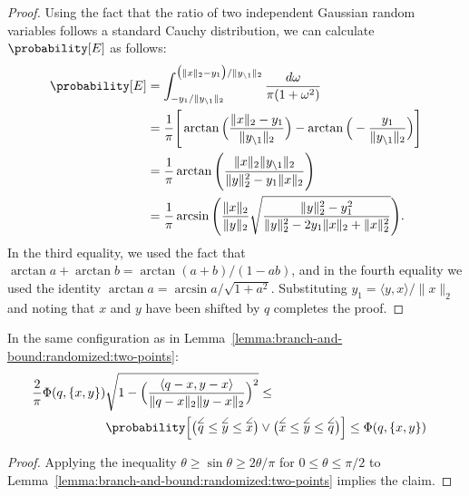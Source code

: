 \begin{proof}
Using the fact that the ratio of two independent Gaussian random variables follows a standard Cauchy distribution,
we can calculate $\probability[ E ]$ as follows:
\begin{align*}
    \probability[ E ] &= \int_{-y_1/\lVert y_{\setminus 1} \rVert_2}^{\big(\lVert x \rVert_2 - y_1\big)/\lVert y_{\setminus 1} \rVert_2} \frac{d \omega}{\pi (1 + \omega^2)} \\
    &= \frac{1}{\pi} \Bigg[ \arctan\Big( \frac{\lVert x \rVert_2 - y_1}{\lVert y_{\setminus 1} \rVert_2} \Big) - \arctan \Big( -\frac{y_1}{\lVert y_{\setminus 1} \rVert_2} \Big) \Bigg] \\
    &= \frac{1}{\pi} \arctan\Bigg( \frac{\lVert x \rVert_2 \lVert y_{\setminus 1} \rVert_2}{\lVert y \rVert_2^2 - y_1 \lVert x \rVert_2} \Bigg) \\
    &= \frac{1}{\pi} \arcsin\Bigg( \frac{\lVert x \rVert_2}{\lVert y \rVert_2} \sqrt{\frac{\lVert y \rVert_2^2 - y_1^2}{\lVert y \rVert_2^2 - 2y_1 \lVert x \rVert_2 + \lVert x \rVert_2^2}} \Bigg).
\end{align*}
In the third equality, we used the fact that $\arctan a + \arctan b = \arctan (a + b)/(1 - ab)$, and in the fourth equality
we used the identity $\arctan a = \arcsin a / \sqrt{1 + a^2}$. Substituting $y_1 = \langle y, x \rangle / \lVert x \rVert_2$
and noting that $x$ and $y$ have been shifted by $q$ completes the proof.
\end{proof}

\begin{corollary}
\label{lemma:branch-and-bound:randomized:two-points-corollary}
    In the same configuration as in Lemma~\ref{lemma:branch-and-bound:randomized:two-points}:
    \begin{align*}
        \frac{2}{\pi} \Phi(q, \{ x, y\})
            & \sqrt{1 - \Big(
                \frac{\langle q - x, y - x \rangle}{\lVert q - x \rVert_2 \lVert y - x \rVert_2}
            \Big)^2} \leq& \\
        &\probability\Big[
            \big( \overset{\angle}{q} \leq \overset{\angle}{y} \leq \overset{\angle}{x} \big) \lor
            \big( \overset{\angle}{x} \leq \overset{\angle}{y} \leq \overset{\angle}{q} \big) \Big] \leq 
            \Phi(q, \{ x, y\})
    \end{align*}
\end{corollary}
\begin{proof}
Applying the inequality $\theta \geq \sin \theta \geq 2 \theta/\pi$ for $0 \leq \theta \leq \pi/2$ to Lemma~\ref{lemma:branch-and-bound:randomized:two-points}
implies the claim.
\end{proof}

